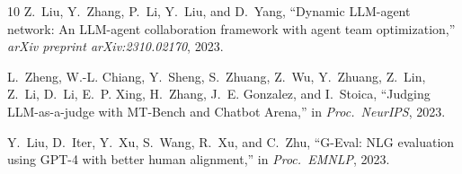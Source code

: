 \documentclass[conference]{IEEEtran}
\begin{document}
\begin{thebibliography}{10}
Z.~Liu, Y.~Zhang, P.~Li, Y.~Liu, and D.~Yang,
``Dynamic LLM-agent network: An LLM-agent collaboration framework with agent team optimization,''
\emph{arXiv preprint arXiv:2310.02170}, 2023.

L.~Zheng, W.-L. Chiang, Y.~Sheng, S.~Zhuang, Z.~Wu, Y.~Zhuang, Z.~Lin, Z.~Li, D.~Li, E.~P. Xing, H.~Zhang, J.~E. Gonzalez, and I.~Stoica,
``Judging LLM-as-a-judge with MT-Bench and Chatbot Arena,''
in \emph{Proc.\ NeurIPS}, 2023.

Y.~Liu, D.~Iter, Y.~Xu, S.~Wang, R.~Xu, and C.~Zhu,
``G-Eval: NLG evaluation using GPT-4 with better human alignment,''
in \emph{Proc.\ EMNLP}, 2023.

\end{thebibliography}
\end{document}
